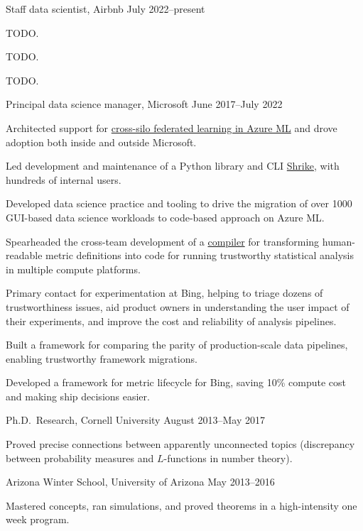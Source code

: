 \documentclass[11pt, letterpaper]{awesome-cv}
\begin{document}
\begin{cventries}

  \cventry
  {Staff data scientist, Airbnb}
  {}{}
  {July 2022--present}
  {
    \begin{cvitems}
      \item{TODO.}
      \item{TODO.}
      \item{TODO.}
    \end{cvitems}
  }

\cventry
  {Principal data science manager, Microsoft}
  {}{}
  {June 2017--July 2022}
  {
    \begin{cvitems}
      \item{Architected support for \href{https://github.com/Azure-Samples/azure-ml-federated-learning}{cross-silo federated learning in Azure ML} and drove adoption both inside and outside Microsoft.}
      \item{Led development and maintenance of a Python library and CLI \href{http://shrike-docs.com/}{Shrike}, with hundreds of internal users.}
      \item{Developed data science practice and tooling to drive the migration of over 1000 GUI-based data science workloads to code-based approach on Azure ML.}
      \item{Spearheaded the cross-team development of a \href{https://arxiv.org/abs/1912.00913}{compiler} for transforming human-readable metric definitions into code for running trustworthy statistical analysis in multiple compute platforms.}
      \item{Primary contact for experimentation at Bing, helping to triage dozens of trustworthiness issues, aid product owners in understanding the user impact of their experiments, and improve the cost and reliability of analysis pipelines.}
      \item{Built a framework for comparing the parity of production-scale data pipelines, enabling trustworthy framework migrations.}
      \item{Developed a framework for metric lifecycle for Bing, saving 10\% compute cost and making ship decisions easier.}
    \end{cvitems}
  }

\cventry
  {Ph.D.~Research, Cornell University}
  {}{}
  {August 2013--May 2017}
  {
    \begin{cvitems}
      \item{Proved precise connections between apparently unconnected topics (discrepancy between probability measures and $L$-functions in number theory).}
    \end{cvitems}
  }

\cventry
  {Arizona Winter School, University of Arizona}
  {}{}
  {May 2013--2016}
  {
    \begin{cvitems}
      \item{Mastered concepts, ran simulations, and proved theorems in a high-intensity one week program.}
    \end{cvitems}
  }
\end{cventries}
\end{document}
